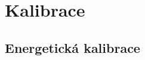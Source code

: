 \section{Kalibrace}\label{chap:detectors:calibration}

\subsection{Energetická kalibrace}\label{chap:detectors:calibration:tot}